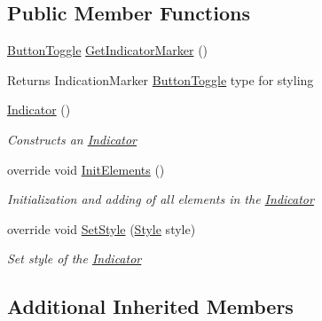 \subsection*{Public Member Functions}
\begin{DoxyCompactItemize}
\item 
\mbox{\label{class_space_v_i_l_1_1_indicator_a7b4f51c939bd3de42bb343f374e4efa1}} 
\mbox{\hyperlink{class_space_v_i_l_1_1_button_toggle}{Button\+Toggle}} \mbox{\hyperlink{class_space_v_i_l_1_1_indicator_a7b4f51c939bd3de42bb343f374e4efa1}{Get\+Indicator\+Marker}} ()
\begin{DoxyCompactList}\small\item\em \begin{DoxyReturn}{Returns}
Indication\+Marker \mbox{\hyperlink{class_space_v_i_l_1_1_button_toggle}{Button\+Toggle}} type for styling 
\end{DoxyReturn}
\end{DoxyCompactList}\item 
\mbox{\hyperlink{class_space_v_i_l_1_1_indicator_a2601a19d889e39b36100e015843001c8}{Indicator}} ()
\begin{DoxyCompactList}\small\item\em Constructs an \mbox{\hyperlink{class_space_v_i_l_1_1_indicator}{Indicator}} \end{DoxyCompactList}\item 
override void \mbox{\hyperlink{class_space_v_i_l_1_1_indicator_a787de3f581ef112a306781a4a9722fb5}{Init\+Elements}} ()
\begin{DoxyCompactList}\small\item\em Initialization and adding of all elements in the \mbox{\hyperlink{class_space_v_i_l_1_1_indicator}{Indicator}} \end{DoxyCompactList}\item 
override void \mbox{\hyperlink{class_space_v_i_l_1_1_indicator_aa9233e9dda656a3634bcc3ace59c00dc}{Set\+Style}} (\mbox{\hyperlink{class_space_v_i_l_1_1_decorations_1_1_style}{Style}} style)
\begin{DoxyCompactList}\small\item\em Set style of the \mbox{\hyperlink{class_space_v_i_l_1_1_indicator}{Indicator}} \end{DoxyCompactList}\end{DoxyCompactItemize}
\subsection*{Additional Inherited Members}


